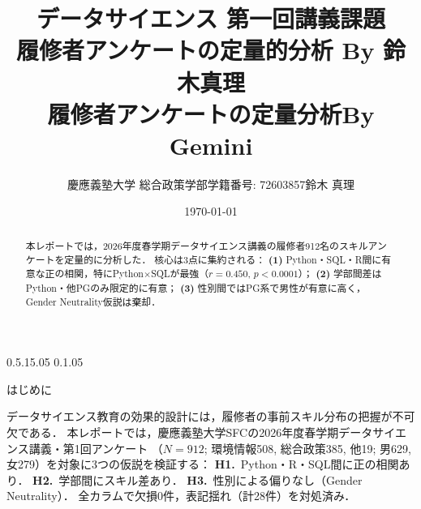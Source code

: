\documentclass[uplatex, dvipdfmx, a4paper, 10pt]{jsarticle}
\title{\vspace{-10mm}データサイエンス 第一回講義課題\\ \normalsize 履修者アンケートの定量的分析 By 鈴木真理\vspace{2mm}\\ \normalsize 履修者アンケートの定量分析By Gemini\vspace{2mm}}
\author{\small 慶應義塾大学 総合政策学部\quad 学籍番号: 72603857\quad 鈴木 真理}
\date{\small \today}
\makeatletter
\renewcommand{\section}{\@startsection{section}{1}{\z@}%
  {0.5\Cvs \@plus.15\Cvs \@minus.05\Cvs}%
  {0.1\Cvs \@plus.05\Cvs}%
  {\normalfont\large\headfont\raggedright}}
\makeatother
\begin{document}
\maketitle
\vspace{-7mm}

\begin{abstract}\small\setlength{\parskip}{0pt}
    本レポートでは，2026年度春学期データサイエンス講義の履修者912名のスキルアンケートを定量的に分析した．
    核心は3点に集約される：
    \textbf{(1)} Python・SQL・R間に有意な正の相関，特にPython$\times$SQLが最強（$r\!=\!0.450$, $p\!<\!0.0001$）；
    \textbf{(2)} 学部間差はPython・他PGのみ限定的に有意；
    \textbf{(3)} 性別間ではPG系で男性が有意に高く，Gender Neutrality仮説は棄却．
\end{abstract}

\vspace{-1mm}
\section{はじめに}

データサイエンス教育の効果的設計には，履修者の事前スキル分布の把握が不可欠である．
本レポートでは，慶應義塾大学SFCの2026年度春学期データサイエンス講義・第1回アンケート
（$N\!=\!912$; 環境情報508, 総合政策385, 他19; 男629, 女279）を対象に3つの仮説を検証する：
\textbf{H1.}~Python・R・SQL間に正の相関あり．
\textbf{H2.}~学部間にスキル差あり．
\textbf{H3.}~性別による偏りなし（Gender Neutrality）．
全カラムで欠損0件，表記揺れ（計28件）を対処済み．
\end{document}
